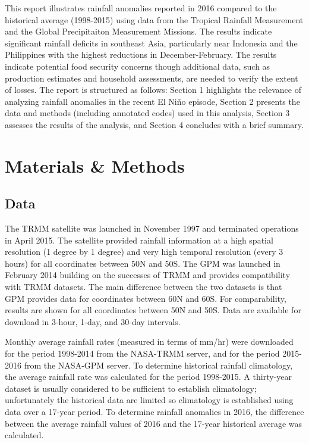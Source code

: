 \documentclass[12pt]{article}
\begin{document}
This report illustrates rainfall anomalies reported in 2016 compared to the historical average (1998-2015) using data from the Tropical Rainfall Measurement and the Global Precipitaiton Measurement Missions. The results indicate significant rainfall deficits in southeast Asia, particularly near Indonesia and the Philippines with the highest reductions in December-February. The results indicate potential food security concerns though additional data, such as production estimates and household assessments, are needed to verify the extent of losses. The report is structured as follows: Section 1 highlights the relevance of analyzing rainfall anomalies in the recent El Ni{\~n}o episode, Section 2 presents the data and methods (including annotated codes) used in this analysis, Section 3 assesses the results of the analysis, and Section 4 concludes with a brief summary.

\section{Materials \& Methods}
\subsection{Data}
The TRMM satellite was launched in November 1997 and terminated operations in April 2015. The satellite provided rainfall information at a high spatial resolution (1 degree  by 1 degree) and very high temporal resolution (every 3 hours) for all coordinates between 50\textdegree N and 50\textdegree S. The GPM was launched in February 2014 building on the successes of TRMM and provides compatibility with TRMM datasets. The main difference between the two datasets is that GPM provides data for coordinates between 60\textdegree N and 60\textdegree S. For comparability, results are shown for all coordinates between 50\textdegree N and 50\textdegree S. Data are available for download in 3-hour, 1-day, and 30-day intervals.

Monthly average rainfall rates (measured in terms of mm/hr) were downloaded for the period 1998-2014 from the NASA-TRMM server, and for the period 2015-2016 from the NASA-GPM server. To determine historical rainfall climatology, the average rainfall rate was calculated for the period 1998-2015. A thirty-year dataset is usually considered to be sufficient to establish climatology; unfortunately the historical data are limited so climatology is established using data over a 17-year period. To determine rainfall anomalies in 2016, the difference between the average rainfall values of 2016 and the 17-year historical average was calculated.
\end{document}
